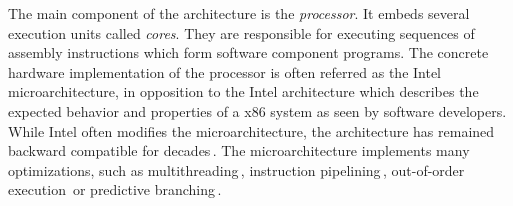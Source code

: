 The main component of the architecture is the \emph{processor}.
%
It embeds several execution units called \emph{cores}.
%
They are responsible for executing sequences of assembly instructions which form
software component programs.
%
The concrete hardware implementation of the processor is often referred as the
Intel microarchitecture, in opposition to the Intel architecture which describes
the expected behavior and properties of a x86 system as seen by software
developers.
%
While Intel often modifies the microarchitecture, the architecture has remained
backward compatible for decades\,\cite{turley2014introx86}.
%
The microarchitecture implements many optimizations, such as
multithreading\,\cite{marr2002hypertheading}, instruction
pipelining\,\cite{fog2012microarchitecture}, out-of-order
execution\,\cite[Section 2]{fog2012microarchitecture} or predictive
branching\,\cite{milenkovic2002branchprediction}\cite[Section
3]{fog2012microarchitecture}.
%
%
